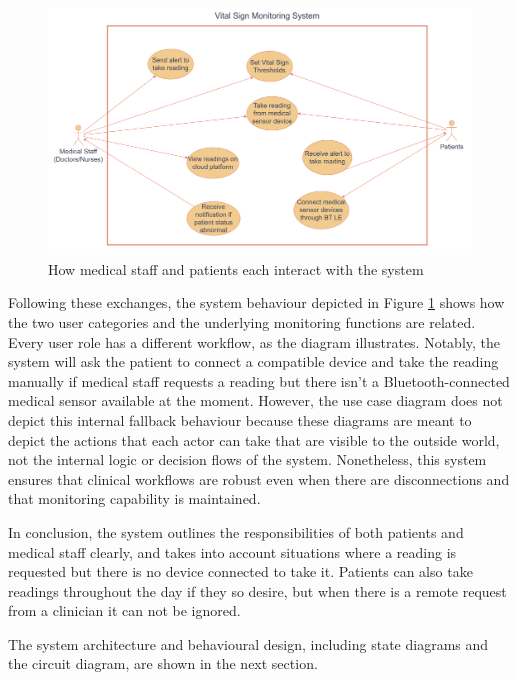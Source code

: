\begin{figure}[H]
	\centering
	\includegraphics[width=\textwidth]{diagrams/use_case_diagram}
	\caption{How medical staff and patients each interact with the system}
	\label{fig:use_case_diagram}
\end{figure}

Following these exchanges, the system behaviour depicted in Figure \ref{fig:use_case_diagram} shows how the two user categories and the underlying monitoring functions are related. Every user role has a different workflow, as the diagram illustrates. Notably, the system will ask the patient to connect a compatible device and take the reading manually if medical staff requests a reading but there isn't a Bluetooth-connected medical sensor available at the moment. However, the use case diagram does not depict this internal fallback behaviour because these diagrams are meant to depict the actions that each actor can take that are visible to the outside world, not the internal logic or decision flows of the system. Nonetheless, this system ensures that clinical workflows are robust even when there are disconnections and that monitoring capability is maintained.

In conclusion, the system outlines the responsibilities of both patients and medical staff clearly, and takes into account situations where a reading is requested but there is no device connected to take it. Patients can also take readings throughout the day if they so desire, but when there is a remote request from a clinician it can not be ignored.

The system architecture and behavioural design, including state diagrams and the circuit diagram, are shown in the next section.

